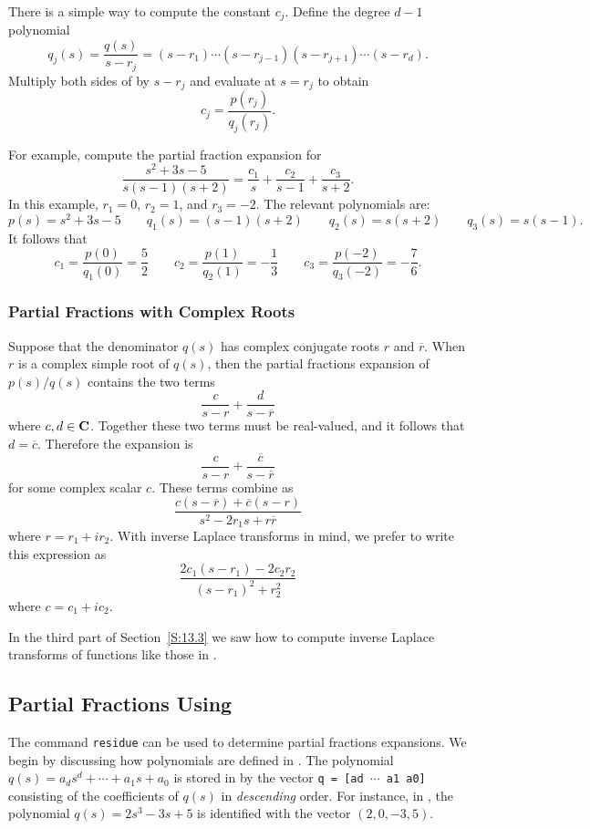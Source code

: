 \documentclass{ximera}
\begin{document}
There is a simple way to compute the constant $c_j$. Define the degree $d-1$
polynomial
\[
q_j(s) = \frac{q(s)}{s-r_j} = 
(s-r_1)\cdots(s-r_{j-1})(s-r_{j+1})\cdots(s-r_d).
\]
Multiply both sides of  by $s-r_j$ and evaluate at $s=r_j$ to 
obtain
\[
c_j = \frac{p(r_j)}{q_j(r_j)}.
\]   

For example, compute the partial fraction expansion for
\[
\frac{s^2+3s-5}{s(s-1)(s+2)} = \frac{c_1}{s}+\frac{c_2}{s-1}+\frac{c_3}{s+2}.
\]
In this example, $r_1=0$, $r_2=1$, and $r_3=-2$.  The relevant polynomials
are:
\[
p(s) = s^2+3s-5 \qquad q_1(s) = (s-1)(s+2) \qquad q_2(s) = s(s+2) \qquad
q_3(s) = s(s-1).
\]
It follows that 
\[
c_1 = \frac{p(0)}{q_1(0)} = \frac{5}{2} \qquad
c_2 = \frac{p(1)}{q_2(1)} = -\frac{1}{3} \qquad
c_3 = \frac{p(-2)}{q_3(-2)} = -\frac{7}{6}.
\]

\subsubsection*{Partial Fractions with Complex Roots}


Suppose that the denominator $q(s)$ has complex conjugate roots $r$ and 
$\overline{r}$.  When $r$ is a complex simple root of $q(s)$, then the 
partial fractions expansion of $p(s)/q(s)$ contains the two terms
\[
\frac{c}{s-r} + \frac{d}{s-\overline{r}}
\]
where $c,d\in\mbox{$\bf{C}$}$.  Together these two terms must be real-valued, and it 
follows that $d=\overline{c}$.  Therefore the expansion is 
\[
\frac{c}{s-r} + \frac{\overline{c}}{s-\overline{r}}
\]
for some complex scalar $c$.  These terms combine as
\[
\frac{c(s-\overline{r})+ \overline{c}(s-r)}{s^2-2r_1s+r\overline{r}}
\]
where $r=r_1+ir_2$.  With inverse Laplace transforms in mind, we prefer 
to write this expression as
\begin{equation}  \label{e:pfreal}
\frac{2c_1(s-r_1)-2c_2r_2}{(s-r_1)^2+r_2^2}
\end{equation}
where $c=c_1+ic_2$.  

In the third part of Section~\ref{S:13.3} we saw how to compute inverse 
Laplace transforms of functions like those in .



\subsection*{Partial Fractions Using \Matlab}

The \Matlab command {\tt residue} can be used to 
determine partial fractions
expansions.  We begin by discussing how polynomials are defined in \Matlabp.  
The polynomial $q(s)=a_ds^d+\cdots+a_1s+a_0$ is stored in \Matlab by the 
vector {\tt q = [ad $\cdots$ a1 a0]} consisting of the coefficients of $q(s)$ 
in {\em descending\/} order.  For instance, in \Matlabp, the polynomial 
$q(s)=2s^3 - 3s +5$ is identified with the vector $(2,0,-3,5)$.  
\end{document}
